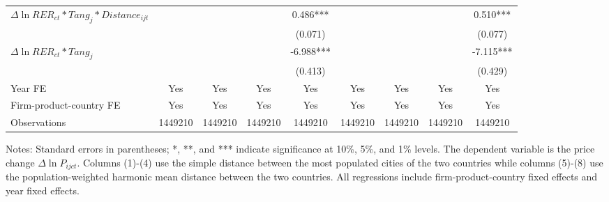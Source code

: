 \documentclass[12pt]{article}
\begin{document}
\begin{table}
{\begin{threeparttable}
\begin{tabular}{lcccccccc}
				$\Delta \ln RER_{ct}*Tang_{j}*Distance_{ijt}$ &       &       &       & 0.486***
				&       &       &       & 0.510***\\
				&       &       &       & (0.071) &       &       &       & (0.077)\\
				$\Delta \ln RER_{ct}*Tang_{j}$ &       &       &       & -6.988*** &       &       &       & -7.115***\\
				&       &       &       & (0.413) &       &       &       & (0.429)\\
				Year FE  & Yes   & Yes   & Yes   & Yes & Yes   & Yes   & Yes   & Yes\\
				Firm-product-country FE & Yes   & Yes   & Yes   & Yes & Yes   & Yes   & Yes   & Yes\\
				Observations & 1449210 & 1449210 & 1449210 & 1449210 & 1449210 & 1449210 & 1449210 & 1449210\\
				\bottomrule
			\end{tabular}
			\begin{tablenotes}
				\footnotesize
				\item[Notes:] Standard errors in parentheses; *, **, and *** indicate significance at 10\%, 5\%, and 1\% levels. The dependent variable is the price change $\Delta \ln P_{ijct}$. Columns (1)-(4) use the simple distance between the most populated cities of the two countries while columns (5)-(8) use the population-weighted harmonic mean distance between the two countries. All regressions include firm-product-country fixed effects and year fixed effects.
			\end{tablenotes}
		\end{threeparttable}
	}
	\label{tab.source.distance}
\end{table}
\end{document}
